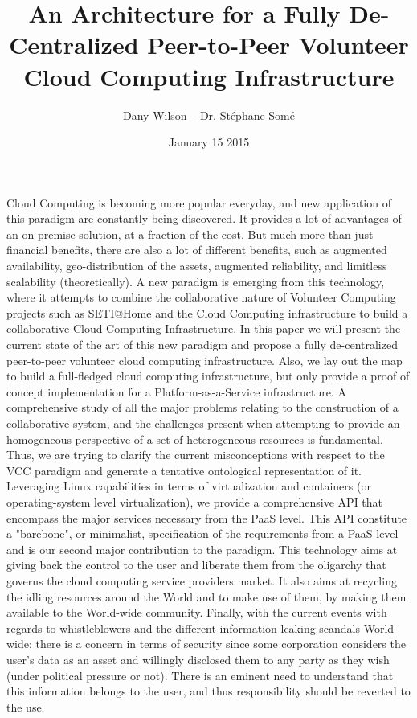 \documentclass{article}
\begin{document}
\title{An Architecture for a Fully De-Centralized Peer-to-Peer Volunteer Cloud Computing Infrastructure}
\author{Dany Wilson -- Dr. St\'ephane Som\'e} 
\date{January 15 2015}

\maketitle 

Cloud Computing is becoming more popular everyday, and new application of this paradigm
are constantly being discovered. It provides a lot of advantages of an on-premise
solution, at a fraction of the cost. But much more than just financial benefits, there are
also a lot of different benefits, such as augmented availability, geo-distribution of the
assets, augmented reliability, and limitless scalability (theoretically). A new paradigm
is emerging from this technology, where it attempts to combine the collaborative nature of
Volunteer Computing projects such as SETI@Home and the Cloud Computing infrastructure to
build a collaborative Cloud Computing Infrastructure. In this paper we will present the
current state of the art of this new paradigm and propose a fully de-centralized
peer-to-peer volunteer cloud computing infrastructure. Also, we lay out the map to build a
full-fledged cloud computing infrastructure, but only provide a proof of concept
implementation for a Platform-as-a-Service infrastructure. A comprehensive study of all
the major problems relating to the construction of a collaborative system, and the
challenges present when attempting to provide an homogeneous perspective of a set of
heterogeneous resources is fundamental. Thus, we are trying to clarify the current
misconceptions with respect to the VCC paradigm and generate a tentative ontological
representation of it. Leveraging Linux capabilities in terms of virtualization and
containers (or operating-system level virtualization), we provide a comprehensive API that
encompass the major services necessary from the PaaS level. This API constitute a
"barebone", or minimalist, specification of the requirements from a PaaS level and is our
second major contribution to the paradigm. This technology aims at giving back the control
to the user and liberate them from the oligarchy that governs the cloud computing service
providers market. It also aims at recycling the idling resources around the World and to
make use of them, by making them available to the World-wide community. Finally, with the
current events with regards to whistleblowers and the different information leaking
scandals World-wide; there is a concern in terms of security since some corporation
considers the user's data as an asset and willingly disclosed them to any party as they
wish (under political pressure or not). There is an eminent need to understand that this
information belongs to the user, and thus responsibility should be reverted to the use. 
\end{document}
